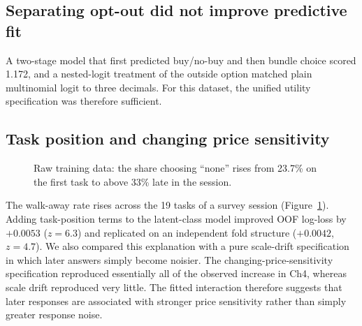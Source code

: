 \documentclass[11pt]{article}
\begin{document}
\subsection{Separating opt-out did not improve predictive fit}

A two-stage model that first predicted buy/no-buy and then bundle choice scored 1.172, and
a nested-logit treatment of the outside option matched plain multinomial logit to three
decimals. For this dataset, the unified utility specification was therefore sufficient.

\subsection{Task position and changing price sensitivity}\label{sub:fatigue}

\begin{figure}[b]
\centering
{}
\caption{Raw training data: the share choosing ``none'' rises from 23.7\% on the first
task to above 33\% late in the session.}
\label{fig:fatigue}
\end{figure}

The walk-away rate rises across the 19 tasks of a survey session
(Figure~\ref{fig:fatigue}). Adding task-position terms to the latent-class model improved
OOF log-loss by $+0.0053$ ($z=6.3$) and replicated on an independent fold structure
($+0.0042$, $z=4.7$). We also compared this explanation with a pure scale-drift
specification in which later
answers simply become noisier. The changing-price-sensitivity specification reproduced
essentially all of the observed increase in Ch4, whereas scale drift reproduced very
little. The fitted interaction therefore suggests that later responses are associated
with stronger price sensitivity rather than simply greater response noise.
\end{document}
